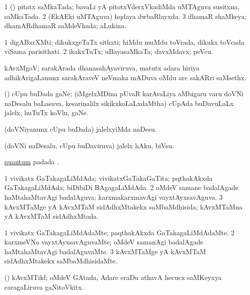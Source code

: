 \bentry
{}
\gl{\gu}
\bmng
\bnum
\num{1} (\kanmu) pitatx saMkaTada; bavaLi yA pitotxVderxVkadiMda uMTAguva susitxna, saMkaTada. 
\num{2} (EkAEki uMTAguva) hqdaya dwbaRlayxda. 
\num{3} dhamaR shaMkeya; dhamARdhamaR saMdeVhada; aLukina. 
\enum
\emng
\eentry

\bentry
{}
\gl{\nA}
\bmng
\bnum
\num{1} digABxrXMti; dikukxgeTaTx sithxti; hiMdu muMdu toVrada, dikukx toVcada viSama parisithxti. 
\num{2} ikakxTuTx; uBayasaMkaTa; davxMdavx; peVcu. 
\enum
\emng
\eentry

\bentry
{}
\gl{\nA}
\bmng
kAvxMgoV; sarakArada dhanasahAyaviruva, matutx adara hiriya adhikArigaLanunx sarakAraveV neVmaka mADuva oMdu are sakARri saMsethx. 
\emng
\eentry

\bentry
{}
\gl{\nA}
\bmng
(\birx) cUpu buDada gaNe; (iMgelxMDina pUvaR karAvaLiya aMbigaru \mo varu doVNi naDesalu baLasuva, kesarinalilx sikikxkoLaLxdaMtha) cUpAda buDavuLaLx jalelx, huTuTx koVlu, gaNe. 
\emng
\eentry

\bentry
{}
\gl{\sakirx}
\bmng
(doVNiyanunx cUpu buDada) jalelxyiMda naDesu. 
\emng

\noindent
\gl{\akirx}
\bmng
(doVNi naDesalu, cUpu buDaviruva) jalelx hAku, biVsu. 
\emng
\eentry

\bentry
{}
\gl{\nA}
\bmng
\hyperlink{quantum}{quantum} padada \bava. 
\emng
\eentry

\bentry
{}
\gl{\gu}
\bmng
\bnum
\num{1} vivikatx GaTakagaLiMdAda; vivikatxGaTakaGaTita; pqthakAkxda GaTakagaLiMdAda; biDibiDi BAgagaLiMdAda. 
\num{2} oMdeV samane badalAgade haMtahaMtavAgi badalAguva; karxmakarxmavAgi vayxtAyxsavAguva. 
\num{3} kAvxMTaMge yA kAvxMTaM sidAdhxMtakekx saMbaMdhisida; kAvxMTaMna yA kAvxMTaM sidAdhxMtada. 
\enum
\emng
\eentry

\bentry
{}
\gl{\kirxvi}
\bmng
\bnum
\num{1} vivikatx GaTakagaLiMdAdaMte; paqthakAkxda GaTakagaLiMdAdaMte. 
\num{2} karxmeVNa vayxtAyxsavAguvaMte; oMdeV samanAgi badalAgade haMtahaMtavAgi badalAguvaMte. 
\num{3} kAvxMTaMge yA kAvxMTaM sidAdhxMtakekx saMbaMdhisidaMte. 
\enum
\emng
\eentry

\bentry
{}
\gl{\nA}
\bmng
(\ga) kAvxMTikf; oMdeV GAtada, Adare eraDu athavA hecucx saMKeyxya caragaLiruva gaNitoVkitx. 
\emng
\eentry

